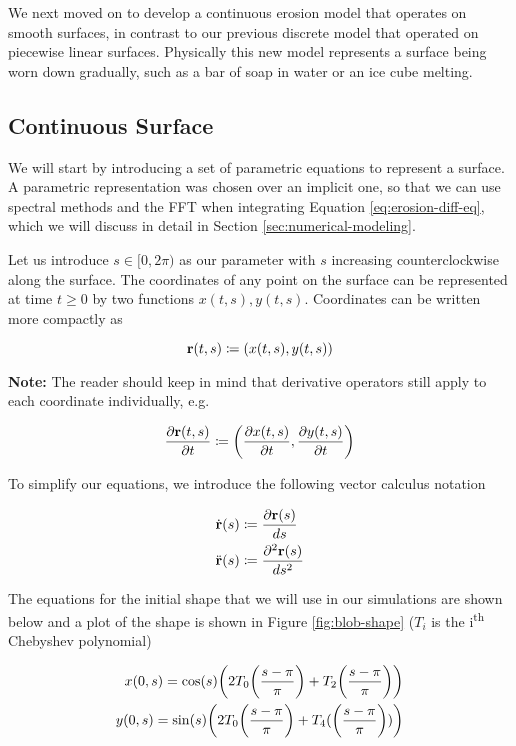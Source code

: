 
We next moved on to develop a continuous erosion model that operates on smooth surfaces, in contrast to our previous discrete model that operated on piecewise linear surfaces. Physically this new model represents a surface being worn down gradually, such as a bar of soap in water or an ice cube melting. 

\subsection*{Continuous Surface}

We will start by introducing a set of parametric equations to represent a surface. A parametric representation was chosen over an implicit one, so that we can use spectral methods and the FFT when integrating Equation \ref{eq:erosion-diff-eq}, which we will discuss in detail in Section \ref{sec:numerical-modeling}. 

Let us introduce $s \in [0, 2\pi)$ as our parameter with $s$ increasing counterclockwise along the surface. The coordinates of any point on the surface can be represented at time $t \ge 0$ by two functions $x(t, s), y(t, s)$. Coordinates can be written more compactly as

\[ 
  \bvec{r}(t, s) \coloneqq \paren{x(t, s), y(t, s)}
\]

\textbf{Note:} The reader should keep in mind that derivative operators still apply to each coordinate individually, e.g.

\[
  \frac{\partial \bvec{r}(t, s)}{\partial t} \coloneqq \paren{\frac{\partial x(t, s)}{\partial t}, \frac{\partial y(t, s)}{\partial t}}
\]

To simplify our equations, we introduce the following vector calculus notation

\begin{align*}
  \dot{\mathbf{r}}(s)& \coloneqq \frac{\partial \mathbf{r}(s)}{ds}\\
  \ddot{\mathbf{r}}(s)& \coloneqq \frac{\partial^2 \mathbf{r}(s)}{ds^2}
\end{align*}

The equations for the initial shape that we will use in our simulations are shown below and a plot of the shape is shown in Figure \ref{fig:blob-shape} ($T_i$ is the i\textsuperscript{th} Chebyshev polynomial)

\begin{align*}
  x(0, s) = \cos(s) \paren{2 T_0\paren{\frac{s-\pi}{\pi}} + T_2\paren{\frac{s-\pi}{\pi}}}\\
  y(0, s) = \sin(s) \paren{2 T_0\paren{\frac{s-\pi}{\pi}} + T_4(\paren{\frac{s-\pi}{\pi}})}
\end{align*}

